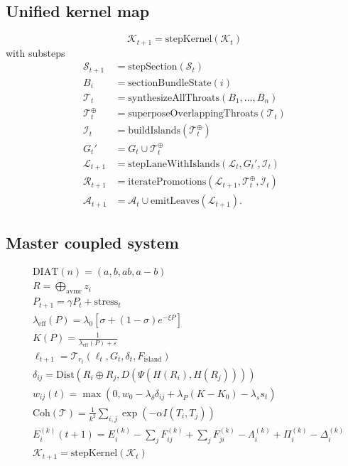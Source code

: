 \documentclass[11pt,a4paper]{article}
\begin{document}
\subsection{Unified kernel map}

\begin{equation}
\mathcal{K}_{t+1}=\mathrm{stepKernel}(\mathcal{K}_t)
\label{eq:kernel_map}
\end{equation}
with substeps
\begin{align}
\mathcal{S}_{t+1}&=\mathrm{stepSection}(\mathcal{S}_t)
\label{eq:kernel_sections}\\
B_i&=\mathrm{sectionBundleState}(i)
\label{eq:kernel_bundle}\\
\mathcal{T}_t&=\mathrm{synthesizeAllThroats}(B_1,\dots,B_n)
\label{eq:kernel_throats}\\
\mathcal{T}_t^\oplus&=\mathrm{superposeOverlappingThroats}(\mathcal{T}_t)
\label{eq:kernel_superposed}\\
\mathcal{I}_t&=\mathrm{buildIslands}(\mathcal{T}_t^\oplus)
\label{eq:kernel_islands}\\
G_t'&=G_t\cup\mathcal{T}_t^\oplus
\label{eq:kernel_injected}\\
\mathcal{L}_{t+1}&=\mathrm{stepLaneWithIslands}(\mathcal{L}_t,G_t',\mathcal{I}_t)
\label{eq:kernel_lanes}\\
\mathcal{R}_{t+1}&=\mathrm{iteratePromotions}(\mathcal{L}_{t+1},\mathcal{T}_t^\oplus,\mathcal{I}_t)
\label{eq:kernel_routes}\\
\mathcal{A}_{t+1}&=\mathcal{A}_t\cup\mathrm{emitLeaves}(\mathcal{L}_{t+1}).
\label{eq:kernel_avmr}
\end{align}

\subsection{Master coupled system}

\begin{equation}
\boxed{
\begin{aligned}
&\mathrm{DIAT}(n)=(a,b,ab,a-b)\\
&R=\bigoplus_{\mathrm{avmr}}z_i\\
&P_{t+1}=\gamma P_t+\mathrm{stress}_t\\
&\lambda_{\mathrm{eff}}(P)=\lambda_0[\sigma+(1-\sigma)e^{-\xi P}]\\
&K(P)=\frac{1}{\lambda_{\mathrm{eff}}(P)+\varepsilon}\\
&\ell_{t+1}=\mathcal{T}_{r_t}(\ell_t,G_t,\delta_t,F_{\mathrm{island}})\\
&\delta_{ij}=\mathrm{Dist}(R_i\oplus R_j,D(\Psi(H(R_i),H(R_j))))\\
&w_{ij}(t)=\max(0,w_0-\lambda_\delta\delta_{ij}+\lambda_P(K-K_0)-\lambda_s s_t)\\
&\mathrm{Coh}(\mathcal{T})=\frac{1}{k^2}\sum_{i,j}\exp(-\alpha I(T_i,T_j))\\
&E_i^{(k)}(t+1)=E_i^{(k)}-\sum_jF_{ij}^{(k)}+\sum_jF_{ji}^{(k)}-\Lambda_i^{(k)}+\Pi_i^{(k)}-\Delta_i^{(k)}\\
&\mathcal{K}_{t+1}=\mathrm{stepKernel}(\mathcal{K}_t)
\end{aligned}
}
\label{eq:master_system}
\end{equation}
\end{document}
